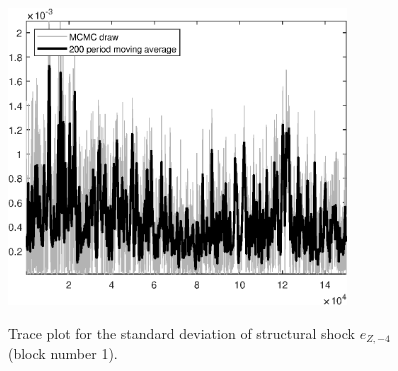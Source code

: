 \begin{figure}[H]
\centering
  \includegraphics[width=0.8\textwidth]{BRS_sectoral_KK/graphs/TracePlot_SE_e_Z_news_blck_1}\\
    \caption{Trace plot for the standard deviation of structural shock ${e_{Z,-4}}$ (block number 1).}
\end{figure}
